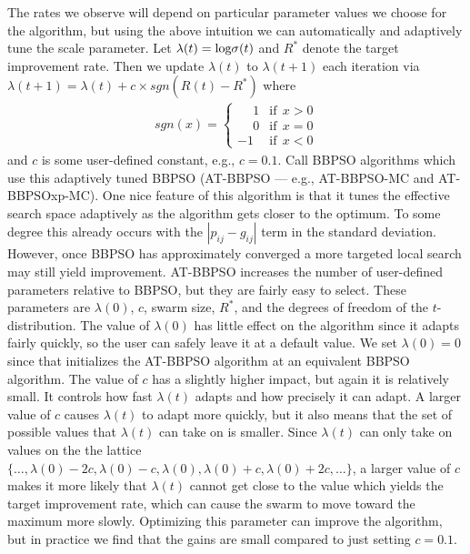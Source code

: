 \documentclass[12pt]{article}
\def\log{\hbox{log}}
\begin{document}

The rates we observe will depend on particular parameter values we choose for the algorithm, but using the above intuition we can automatically and adaptively tune the scale parameter. Let $\lambda(t) = \log \sigma(t)$ and $R^*$ denote the target improvement rate. Then we update $\lambda(t)$ to $\lambda(t+1)$ each iteration via $\lambda(t+1) = \lambda(t) + c\times sgn(R(t) - R^*)$ where 
\begin{align*}
sgn(x) = \begin{cases} \phantom{-}1 & \mathrm{ if  }\ \ x > 0\\
                       \phantom{-}0 & \mathrm{ if  }\ \ x = 0\\
                                - 1 & \mathrm{ if  }\ \ x < 0\end{cases}
\end{align*}
and $c$ is some user-defined constant, e.g., $c=0.1$. Call BBPSO algorithms which use this adaptively tuned BBPSO (AT-BBPSO --- e.g., AT-BBPSO-MC and AT-BBPSOxp-MC). One nice feature of this algorithm is that it tunes the effective search space adaptively as the algorithm gets closer to the optimum. To some degree this already occurs with the $|p_{ij} - g_{ij}|$ term in the standard deviation. However, once BBPSO has approximately converged a more targeted local search may still yield improvement. AT-BBPSO increases the number of user-defined parameters relative to BBPSO, but they are fairly easy to select. These parameters are $\lambda(0)$, $c$, swarm size, $R^*$, and the degrees of freedom of the $t$-distribution. The value of $\lambda(0)$ has little effect on the algorithm since it adapts fairly quickly, so the user can safely leave it at a default value. We set $\lambda(0)=0$ since that initializes the AT-BBPSO algorithm at an equivalent BBPSO algorithm. The value of $c$ has a slightly higher impact, but again it is relatively small. It controls how fast $\lambda(t)$ adapts and how precisely it can adapt. A larger value of $c$ causes $\lambda(t)$ to adapt more quickly, but it also means that the set of possible values that $\lambda(t)$ can take on is smaller. Since $\lambda(t)$ can only take on values on the the lattice $\{\dots, \lambda(0) - 2c, \lambda(0) - c, \lambda(0), \lambda(0) + c, \lambda(0) + 2c, \dots\}$, a larger value of $c$ makes it more likely that $\lambda(t)$ cannot get close to the value which yields the target improvement rate, which can cause the swarm to move toward the maximum more slowly. Optimizing this parameter can improve the algorithm, but in practice we find that the gains are small compared to just setting $c=0.1$.
\end{document}
